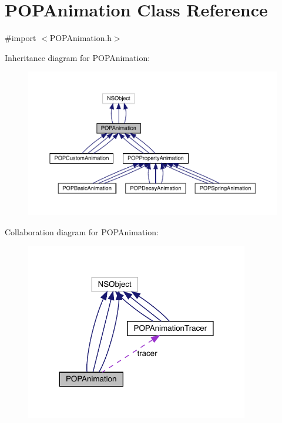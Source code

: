 \hypertarget{interface_p_o_p_animation}{}\section{P\+O\+P\+Animation Class Reference}
\label{interface_p_o_p_animation}


{\ttfamily \#import $<$P\+O\+P\+Animation.\+h$>$}



Inheritance diagram for P\+O\+P\+Animation\+:\nopagebreak
\begin{figure}[H]
\begin{center}
\leavevmode
\includegraphics[width=350pt]{interface_p_o_p_animation__inherit__graph}
\end{center}
\end{figure}


Collaboration diagram for P\+O\+P\+Animation\+:\nopagebreak
\begin{figure}[H]
\begin{center}
\leavevmode
\includegraphics[width=276pt]{interface_p_o_p_animation__coll__graph}
\end{center}
\end{figure}
